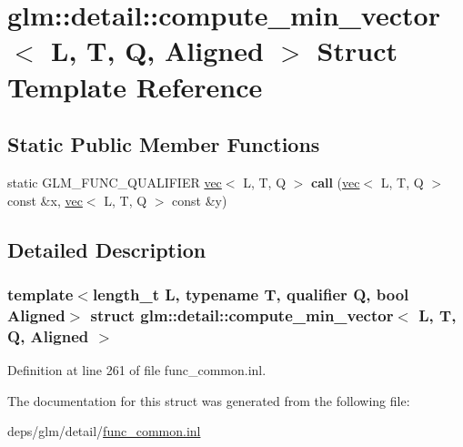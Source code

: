 \hypertarget{structglm_1_1detail_1_1compute__min__vector}{}\section{glm\+:\+:detail\+:\+:compute\+\_\+min\+\_\+vector$<$ L, T, Q, Aligned $>$ Struct Template Reference}
\label{structglm_1_1detail_1_1compute__min__vector}
\subsection*{Static Public Member Functions}
\begin{DoxyCompactItemize}
\item 
\mbox{\label{structglm_1_1detail_1_1compute__min__vector_ad55330fa32297063433503856406fb00}} 
static G\+L\+M\+\_\+\+F\+U\+N\+C\+\_\+\+Q\+U\+A\+L\+I\+F\+I\+ER \hyperlink{structglm_1_1vec}{vec}$<$ L, T, Q $>$ {\bfseries call} (\hyperlink{structglm_1_1vec}{vec}$<$ L, T, Q $>$ const \&x, \hyperlink{structglm_1_1vec}{vec}$<$ L, T, Q $>$ const \&y)
\end{DoxyCompactItemize}


\subsection{Detailed Description}
\subsubsection*{template$<$length\+\_\+t L, typename T, qualifier Q, bool Aligned$>$\newline
struct glm\+::detail\+::compute\+\_\+min\+\_\+vector$<$ L, T, Q, Aligned $>$}



Definition at line 261 of file func\+\_\+common.\+inl.



The documentation for this struct was generated from the following file\+:\begin{DoxyCompactItemize}
\item 
deps/glm/detail/\hyperlink{func__common_8inl}{func\+\_\+common.\+inl}\end{DoxyCompactItemize}
